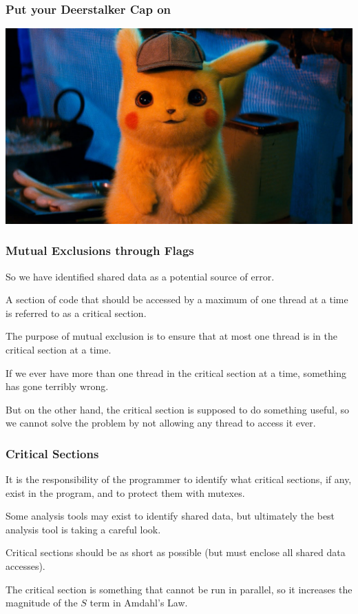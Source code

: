 \begin{frame}
\frametitle{Put your Deerstalker Cap on}

\begin{center}
	\includegraphics[width=\textwidth]{images/detectivepikachu.jpg}
\end{center}

\end{frame}


\begin{frame}
	\frametitle{Mutual Exclusions through Flags}

	So we have identified shared data as a potential source of error.

	A section of code that should be accessed by a maximum of one thread at a time is referred to as a \alert{critical section}.

	The purpose of mutual exclusion is to ensure that at most one thread is in the critical section at a time.

	If we ever have more than one thread in the critical section at a time, something has gone terribly wrong.

	But on the other hand, the critical section is supposed to do something useful, so we cannot solve the problem by not allowing any thread to access it ever.

\end{frame}

\begin{frame}
	\frametitle{Critical Sections}

	It is the responsibility of the programmer to identify what critical sections, if any, exist in the program, and to protect them with mutexes.

	Some analysis tools may exist to identify shared data, but ultimately the best analysis tool is taking a careful look.

	Critical sections should be as short as possible (but must enclose all shared data accesses).

	The critical section is something that cannot be run in parallel, so it increases the magnitude of the $S$ term in Amdahl's Law.

\end{frame}

